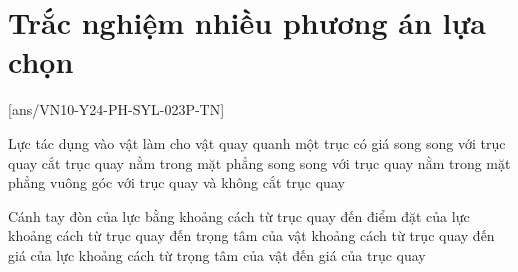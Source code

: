 \let\lesson\undefined
\newcommand{\lesson}{\phantomlesson{Bài 14.}}
\setcounter{section}{2}
\section{Trắc nghiệm nhiều phương án lựa chọn}
\setcounter{ex}{0}
[ans/VN10-Y24-PH-SYL-023P-TN]
\begin{ex}
	Lực tác dụng vào vật làm cho vật quay quanh một trục có giá
	\choice
	{song song với trục quay}
	{cắt trục quay}
	{nằm trong mặt phẳng song song với trục quay}
	{\True nằm trong mặt phẳng vuông góc với trục quay và không cắt trục quay}
\end{ex}
\begin{ex}
	Cánh tay đòn của lực bằng
	\choice
	{khoảng cách từ trục quay đến điểm đặt của lực}
	{khoảng cách từ trục quay đến trọng tâm của vật}
	{\True khoảng cách từ trục quay đến giá của lực}
	{khoảng cách từ trọng tâm của vật đến giá của trục quay}
	\loigiai{}
\end{ex}

